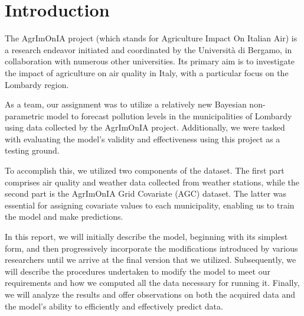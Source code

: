 \documentclass[11pt,a4paper]{article}
\newcommand{\blankpage}{%
    \clearpage
    \begingroup
      \null
      \thispagestyle{foot}%
      \hypersetup{pageanchor=false}%
      \clearpage
    \endgroup
}
\begin{document}

\newpage
\blankpage
\newpage
\tableofcontents
\newpage
\blankpage
\section{Introduction}
\label{sec:introduction}
The AgrImOnIA project (which stands for Agriculture Impact On Italian Air) is a research endeavor initiated and coordinated by the Università di Bergamo, in collaboration with numerous other universities. Its primary aim is to investigate the impact of agriculture on air quality in Italy, with a particular focus on the Lombardy region.

As a team, our assignment was to utilize a relatively new Bayesian non-parametric model to forecast pollution levels in the municipalities of Lombardy using data collected by the AgrImOnIA project. Additionally, we were tasked with evaluating the model's validity and effectiveness using this project as a testing ground.

To accomplish this, we utilized two components of the dataset. The first part comprises air quality and weather data collected from weather stations, while the second part is the AgrImOnIA Grid Covariate (AGC) dataset. The latter was essential for assigning covariate values to each municipality, enabling us to train the model and make predictions.

In this report, we will initially describe the model, beginning with its simplest form, and then progressively incorporate the modifications introduced by various researchers until we arrive at the final version that we utilized. Subsequently, we will describe the procedures undertaken to modify the model to meet our requirements and how we computed all the data necessary for running it. Finally, we will analyze the results and offer observations on both the acquired data and the model's ability to efficiently and effectively predict data.
\end{document}
